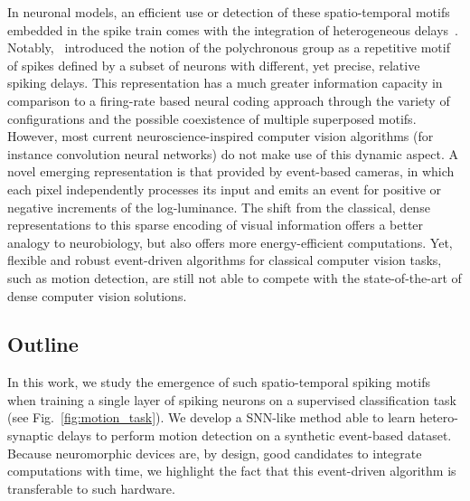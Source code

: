 \documentclass[default]{sn-jnl}%
\theoremstyle{thmstyleone}%
\theoremstyle{thmstyletwo}%
\theoremstyle{thmstylethree}%
\newcommand{\seeFig}[1]{see Fig.~\ref{fig:#1}}%
\begin{document}
In neuronal models, an efficient use or detection of these spatio-temporal motifs embedded in the spike train comes with the integration of heterogeneous delays~\citep{gutig_tempotron_2006, guise_bayesian_2014, zhang_supervised_2020}. Notably,~\citet{izhikevich_polychronization_2006} introduced the notion of the polychronous group as a repetitive motif of spikes defined by a subset of neurons with different, yet precise, relative spiking delays. This representation has a much greater information capacity in comparison to a firing-rate based neural coding approach through the variety of configurations and the possible coexistence of multiple superposed motifs.
However, most current neuroscience-inspired computer vision algorithms (for instance convolution neural networks) do not make use of this dynamic aspect. A novel emerging representation is that provided by event-based cameras, in which each pixel independently processes its input and emits an event for positive or negative increments of the log-luminance. The shift from the classical, dense representations to this sparse encoding of visual information offers a better analogy to neurobiology, but also offers more energy-efficient computations. Yet, flexible and robust event-driven algorithms for classical computer vision tasks, such as motion detection, are still not able to compete with the state-of-the-art of dense computer vision solutions.

\subsection{Outline}


In this work, we study the emergence of such spatio-temporal spiking motifs when training a single layer of spiking neurons on a supervised classification task (\seeFig{motion_task}). We develop a SNN-like method able to learn hetero-synaptic delays to perform motion detection on a synthetic event-based dataset. Because neuromorphic devices are, by design, good candidates to integrate computations with time, we highlight the fact that this event-driven algorithm is transferable to such hardware.
%
\end{document}

